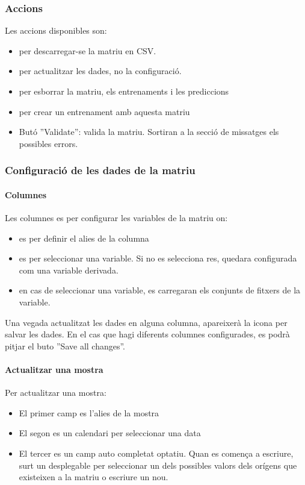 \subsubsection{Accions} 
Les accions disponibles son:
\begin{itemize} 
\item \icondownload per descarregar-se la matriu en CSV.
\item \iconupdate per actualitzar les dades, no la configuració.
\item \icontrash per esborrar la matriu, els entrenaments i les prediccions
\item \icontraining per crear un entrenament amb aquesta matriu
\item But\'{o} ''Validate'': valida la matriu. Sortiran a la secció de missatges els possibles errors.
\end{itemize}

\subsubsection{Configuració de les dades de la matriu}
\paragraph*{Columnes} Les columnes es per configurar les variables de la matriu on:
\begin{itemize}
\item \iconalias es per definir el alies de la columna
\item \iconvariable es per seleccionar una variable. Si no es selecciona res, quedara configurada com una variable derivada.
\item \iconseason en cas de seleccionar una variable, es carregaran els conjunts de fitxers de la variable.
\end{itemize}
Una vegada actualitzat les dades en alguna columna, apareixerà la icona \iconedit per salvar les dades. En el cas que hagi diferents columnes configurades, es podrà pitjar el buto ''Save all changes''.

\paragraph*{Actualitzar una mostra} Per actualitzar una mostra:
\begin{itemize}
\item El primer camp es l'alies de la mostra
\item El segon es un calendari per seleccionar una data
\item El tercer es un camp auto completat optatiu. Quan es comença a escriure, surt un desplegable per seleccionar un dels possibles valors dels orígens que existeixen a la matriu o escriure un nou.
\end{itemize}

